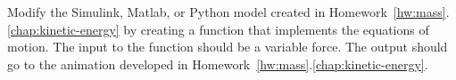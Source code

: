 
Modify the Simulink, Matlab, or Python model created in 
Homework~\ref{hw:mass}.\ref{chap:kinetic-energy} by creating a function that implements the equations of motion.  The input to the function should be a variable force.  The output should go to the animation developed in Homework~\ref{hw:mass}.\ref{chap:kinetic-energy}.
